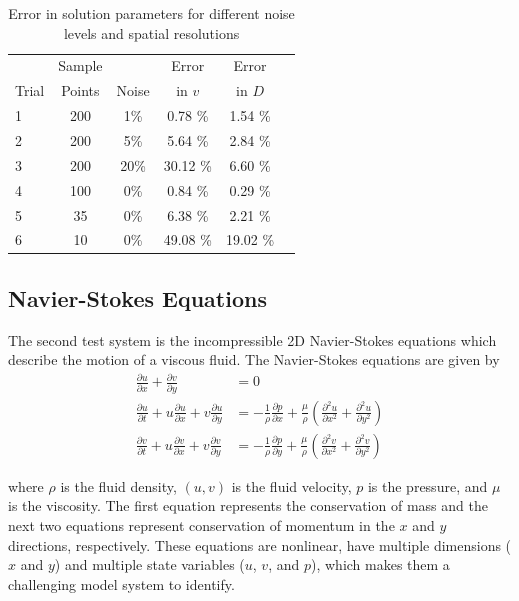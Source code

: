 \documentclass{article}
\begin{document}
\begin{table}[t]
\caption{Error in solution parameters for different noise levels and spatial resolutions}
\label{tab:advdifresults}
\vskip 0.15in
\begin{center}
\begin{small}
\begin{sc}
\begin{tabular}{lccccr}
\toprule
 & Sample &  & Error & Error\\
Trial & Points & Noise & in $v$ & in $D$\\
\midrule
1 & 200 & 1\%  & 0.78 \% & 1.54 \% \\
2 & 200 & 5\%  & 5.64 \% & 2.84 \% \\
3 & 200 & 20\%  & 30.12 \% & 6.60 \% \\
4 & 100 & 0\%  & 0.84 \% & 0.29 \% \\
5 & 35 & 0\%  & 6.38 \% & 2.21 \% \\
6 & 10 & 0\%  & 49.08 \% & 19.02 \% \\
\bottomrule
\end{tabular}
\end{sc}
\end{small}
\end{center}
\vskip -0.1in
\end{table}


\subsection{Navier-Stokes Equations}
The second test system is the incompressible 2D Navier-Stokes equations which describe the motion of a viscous fluid. The Navier-Stokes equations are given by
\begin{align}
  \frac{\partial u}{\partial x} + \frac{\partial v }{\partial y} &= 0 \\
  \frac{\partial u }{\partial t} + u \frac{\partial u }{\partial x} + v \frac{\partial u }{\partial y} &= - \frac{1}{\rho} \frac{\partial p}{\partial x} + \frac{\mu}{\rho}\left( \frac{\partial^2 u}{\partial x^2} + \frac{\partial^2 u}{\partial y^2} \right) \\
\frac{\partial v }{\partial t} + u \frac{\partial v }{\partial x} + v \frac{\partial v }{\partial y} &= - \frac{1}{\rho} \frac{\partial p}{\partial y} + \frac{\mu}{\rho}\left( \frac{\partial^2 v}{\partial x^2} + \frac{\partial^2 v}{\partial y^2} \right)
\end{align}

where $\rho$ is the fluid density, $(u, v)$ is the fluid velocity, $p$ is the pressure, and $\mu$ is the viscosity. The first equation represents the conservation of mass and the next two equations represent conservation of momentum in the $x$ and $y$ directions, respectively. These equations are nonlinear, have multiple dimensions ($x$ and $y$) and multiple state variables ($u$, $v$, and $p$), which makes them a challenging model system to identify.
\end{document}
